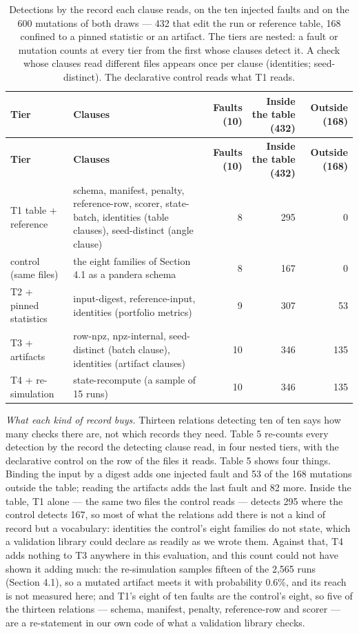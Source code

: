 \documentclass[acmsmall,screen,review]{acmart}
\begin{document}
\begingroup
\small
\setlength\LTleft{\fill}
\setlength\LTright{\fill}
\begin{xltabular}{\textwidth}{>{\hsize}Y>{\hsize}Yrrr}
\caption{Detections by the record each clause reads, on the ten injected faults and on the 600 mutations of both draws --- 432 that edit the run or reference table, 168 confined to a pinned statistic or an artifact. The tiers are nested: a fault or mutation counts at every tier from the first whose clauses detect it. A check whose clauses read different files appears once per clause (identities; seed-distinct). The declarative control reads what T1 reads.}\label{tab:5} \\
\toprule
\textbf{Tier} & \textbf{Clauses} & \textbf{Faults (10)} & \textbf{Inside the table (432)} & \textbf{Outside (168)} \\
\midrule
\endfirsthead
\toprule
\textbf{Tier} & \textbf{Clauses} & \textbf{Faults (10)} & \textbf{Inside the table (432)} & \textbf{Outside (168)} \\
\midrule
\endhead
\endfoot
\bottomrule
\endlastfoot
T1 table + reference & schema, manifest, penalty, reference-row, scorer, state-batch, identities (table clauses), seed-distinct (angle clause) & 8 & 295 & 0 \\*
control (same files) & the eight families of Section 4.1 as a pandera schema & 8 & 167 & 0 \\*
T2 + pinned statistics & input-digest, reference-input, identities (portfolio metrics) & 9 & 307 & 53 \\*
T3 + artifacts & row-npz, npz-internal, seed-distinct (batch clause), identities (artifact clauses) & 10 & 346 & 135 \\*
T4 + re-simulation & state-recompute (a sample of 15 runs) & 10 & 346 & 135 \\
\end{xltabular}
\endgroup


\textit{What each kind of record buys.} Thirteen relations detecting ten of ten says how many checks there are, not which records they need. Table 5 re-counts every detection by the record the detecting clause read, in four nested tiers, with the declarative control on the row of the files it reads. Table 5 shows four things. Binding the input by a digest adds one injected fault and 53 of the 168 mutations outside the table; reading the artifacts adds the last fault and 82 more. Inside the table, T1 alone --- the same two files the control reads --- detects 295 where the control detects 167, so most of what the relations add there is not a kind of record but a vocabulary: identities the control's eight families do not state, which a validation library could declare as readily as we wrote them. Against that, T4 adds nothing to T3 anywhere in this evaluation, and this count could not have shown it adding much: the re-simulation samples fifteen of the 2,565 runs (Section 4.1), so a mutated artifact meets it with probability 0.6\%, and its reach is not measured here; and T1's eight of ten faults are the control's eight, so five of the thirteen relations --- schema, manifest, penalty, reference-row and scorer --- are a re-statement in our own code of what a validation library checks.
\end{document}
